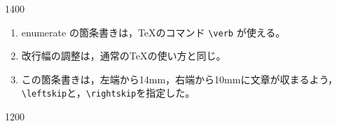 \documentclass{article}
\begin{document}




\vspace*{18mm}

\slidepage
\wall{}
\textinit[108]

\begin{layer}{140}{0}
\end{layer}

\vspace*{2.5mm}
\begin{enumerate}[(1)]
\item
[\ten] enumerate の箇条書きは，TeXのコマンド \verb|\verb| が使える。
\item
[\ten] 改行幅の調整は，通常のTeXの使い方と同じ。
\item
[\ten] この箇条書きは，左端から14mm，右端から10mmに文章が収まるよう，
\verb|\leftskip|と，\verb|\rightskip|を指定した。
\end{enumerate}




\vspace*{18mm}

\slidepage
\wall{}
\textinit[107]

\begin{layer}{120}{0}
\end{layer}

\label{pageend}\mbox{}
\end{document}

